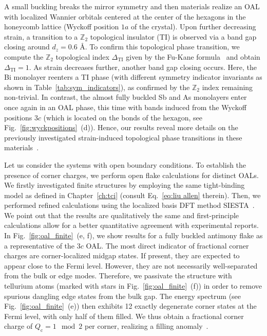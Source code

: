 A small buckling breaks the mirror symmetry and then materials realize an OAL with localized Wannier orbitals centered at the center of the hexagons in the honeycomb lattice (Wyckoff position $1a$ of the crystal). Upon further decreasing strain, a transition to a $\mathbb{Z}_2$ topological insulator (TI) is observed via a band gap closing around $d_z =0.6$ \AA. To confirm this topological phase transition, we compute the $\mathbb{Z}_2$ topological index $\Delta_{\mathrm{TI}}$ given by the Fu-Kane formula~\cite{FuKane2007} and obtain $\Delta_{\mathrm{TI}} = 1$. As strain decreases further, another band gap closing occurs. Here, the Bi monolayer reenters a TI phase (with different symmetry indicator invariants as shown in Table~\ref{tab:sym_indicators}), as confirmed by the $\mathbb{Z}_2$ index remaining non-trivial. In contrast, the almost fully buckled Sb and As monolayers enter once again in an OAL phase, this time with bands induced from the Wyckoff positions $3c$ (which is located on the bonds of the hexagon, see Fig.~\ref{fig:wyckpositions}~(d)). Hence, our results reveal more details on the previously investigated strain-induced topological phase transitions in these materials~\cite{Sb:nontriv,AsTPT, TPTVelem}.

Let us consider the systems with open boundary conditions. To establish the presence of corner charges, we perform open flake calculations for distinct OALs. We firstly investigated finite structures by employing the same tight-binding model as defined in Chapter~\ref{ch:tci} (consult Eq.~\eqref{eq:liu allen} therein). Then, we performed refined calculations using the localized basis DFT method SIESTA~\cite{Soler_2002}. We point out that the results are qualitatively the same and first-principle calculations allow for a better quantitative agreement with experimental reports. In Fig.~\ref{fig:oal_finite}~(e, f), we show results for a fully buckled antimony flake as a representative of the $3c$ OAL. The most direct indicator of fractional corner charges are corner-localized midgap states. If present, they are expected to appear close to the Fermi level. However, they are not necessarily well-separated from the bulk or edge modes. Therefore, we passivate the structure with tellurium atoms (marked with stars in Fig.~\ref{fig:oal_finite}~(f)) in order to remove spurious dangling edge states from the bulk gap. The energy spectrum (see Fig.~\ref{fig:oal_finite}~(e)) then exhibits 12 exactly degenerate corner states at the Fermi level, with only half of them filled. We thus obtain a fractional corner charge of $Q_\mathrm{c} = 1 \mod 2$ per corner, realizing a filling anomaly~\cite{benalcazar2018quantization}.

